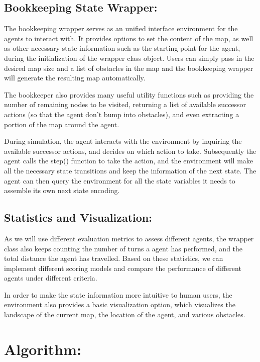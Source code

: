 \documentclass{article}
\begin{document}
\begin{normalsize}
    	    \subsection{Bookkeeping State Wrapper:}
    	        
    	        The bookkeeping wrapper serves as an unified interface environment for the agents to interact with. It provides options to set the content of the map, as well as other necessary state information such as the starting point for the agent, during the initialization of the wrapper class object. Users can simply pass in the desired map size and a list of obstacles in the map and the bookkeeping wrapper will generate the resulting map automatically.\par
    	        The bookkeeper also provides many useful utility functions such as providing the number of remaining nodes to be visited, returning a list of available successor actions (so that the agent don't bump into obstacles), and even extracting a portion of the map around the agent.\par
    	        During simulation, the agent interacts with the environment by inquiring the available successor actions, and decides on which action to take. Subsequently the agent calls the step() function to take the action, and the environment will make all the necessary state transitions and keep the information of the next state. The agent can then query the environment for all the state variables it needs to assemble its own next state encoding.
    	        
    	    
		    \subsection{Statistics and Visualization:}
    	        
    	        As we will use different evaluation metrics to assess different agents, the wrapper class also keeps counting the number of turns a agent has performed, and the total distance the agent has travelled. Based on these statistics, we can implement different scoring models and compare the performance of different agents under different criteria. \par
    	        In order to make the state information more intuitive to human users, the environment also provides a basic visualization option, which visualizes the landscape of the current map, the location of the agent, and various obstacles.
		    
            
        \section{Algorithm:}
            

\end{normalsize}
\end{document}
